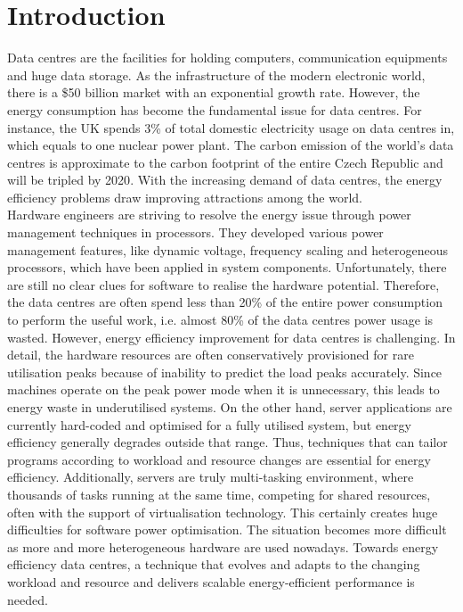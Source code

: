 \section{Introduction}\label{ch:overview}
Data centres are the facilities for holding computers, communication equipments and huge data storage. As the infrastructure of the modern electronic world, there is a \$50 billion market with an exponential growth rate\cite{bigdatacentre}. However, the energy consumption has become the fundamental issue for data centres\cite{EPAreport}\cite{Energygov}. For instance, the UK spends 3\% of total domestic electricity usage on data centres in, which equals to one nuclear power plant\cite{globalactionplan}. The carbon emission of the world’s data centres is approximate to the carbon footprint of the entire Czech Republic and will be tripled by 2020\cite{GeSI}. With the increasing demand of data centres, the energy efficiency problems draw improving attractions among the world.
\\
\linebreak
Hardware engineers are striving to resolve the energy issue through power management techniques in processors\cite{chanandopp}. They developed various power management features, like dynamic voltage, frequency scaling and heterogeneous processors, which have been applied in system components. Unfortunately, there are still no clear clues for software to realise the hardware potential\cite{lookbackandfor}\cite{towardsenergyeff}. Therefore, the data centres are often spend less than 20\% of the entire power consumption to perform the useful work, i.e. almost 80\% of the data centres power usage is wasted\cite{thecaseforepc}. 
However, energy efficiency improvement for data centres is challenging. In detail, the hardware resources are often conservatively provisioned for rare utilisation peaks because of inability to predict the load peaks accurately\cite{energy-aware}\cite{towardsenergyeff}. Since machines operate on the peak power mode when it is unnecessary, this leads to energy waste in underutilised systems. On the other hand, server applications are currently hard-coded and optimised for a fully utilised system, but energy efficiency generally degrades outside that range\cite{towardsenergyeff}\cite{autodatacentre}. Thus, techniques that can tailor programs according to workload and resource changes are essential for energy efficiency\cite{towardsenergyeff}. Additionally, servers are truly multi-tasking environment, where thousands of tasks running at the same time, competing for shared resources, often with the support of virtualisation technology\cite{energy-effcloud}. This certainly creates huge difficulties for software power optimisation. The situation becomes more difficult as more and more heterogeneous hardware are used nowadays\cite{aview}. Towards energy efficiency data centres, a technique that evolves and adapts to the changing workload and resource and delivers scalable energy-efficient performance is needed.

